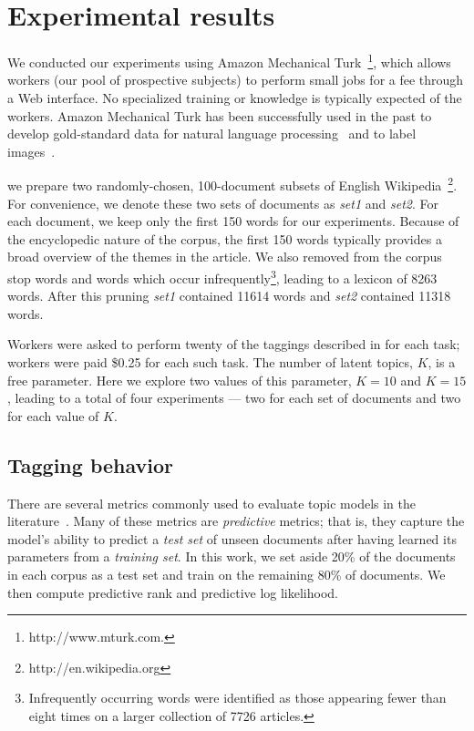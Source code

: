 \section{Experimental results}
\label{sec:experiments}

We conducted our experiments using Amazon Mechanical
Turk~\footnote{http://www.mturk.com.}, which allows workers (our pool
of prospective subjects) to perform small jobs for a fee through a Web
interface.  No specialized training or knowledge is typically expected
of the workers.  Amazon Mechanical Turk has been successfully used in
the past to develop gold-standard data for natural language
processing~\cite{snow-08} and to label images~\cite{imagenet-cvpr09}.

we prepare two randomly-chosen, 100-document subsets of English
Wikipedia~\footnote{http://en.wikipedia.org}.  For convenience, we
denote these two sets of documents as \emph{set1} and \emph{set2}.
For each document, we keep only the first 150 words for our
experiments.  Because of the encyclopedic nature of the corpus, the
first 150 words typically provides a broad overview of the themes in
the article.  We also removed from the corpus stop words and words
which occur infrequently\footnote{Infrequently occurring words were
  identified as those appearing fewer than eight times on a larger
  collection of 7726 articles.}, leading to a lexicon of 8263 words.
After this pruning \emph{set1} contained 11614 words and \emph{set2}
contained 11318 words.

Workers were asked to perform twenty of the taggings described in
 for each task; workers were paid \$0.25 for each
such task.  The number of latent topics, $K$, is a free parameter.
Here we explore two values of this parameter, $K=10$ and $K=15$,
leading to a total of four experiments --- two for each set of
documents and two for each value of $K$.

\subsection{Tagging behavior}
\label{sec:evalmetrics}

There are several metrics commonly used to evaluate topic models in
the literature~\cite{wallach-09}.  Many of these metrics are
\emph{predictive} metrics; that is, they capture the model's ability
to predict a \emph{test set} of unseen documents after having learned
its parameters from a \emph{training set}.  In this work, we set aside
20\% of the documents in each corpus as a test set and train on the
remaining 80\% of documents.  We then compute predictive rank and
predictive log likelihood.


